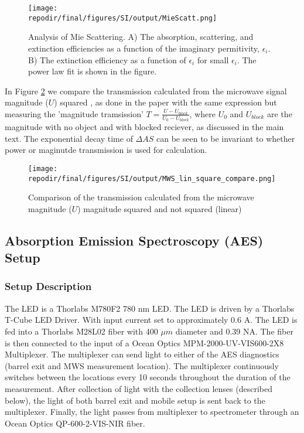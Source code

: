 \begin{figure}[H]
\centering
\texttt{[image: \\repodir/final/figures/SI/output/MieScatt.png]}
\caption{Analysis of Mie Scattering. A) The absorption, scattering, and extinction efficiencies as a function of the imaginary permitivity, $\epsilon_i$. B) The extinction efficiency as a function of $\epsilon_i$ for small $\epsilon_i$. The power law fit is shown in the figure.}
\label{fig:SI_Mie_Scattering}
\end{figure}

In Figure \ref{fig:SI_MWS_lin_square_compare} we compare the transmission calculated from the microwave signal magnitude ($U$) squared , as done in the paper with the same expression but measuring the 'magnitude tramsission' $T  = \frac{U - U_{block}}{U_0 - U_{block}}$, where $U_0$ and $U_{block}$ are the magnitude with no object and with blocked reciever, as discussed in the main text. The exponential decay time of $\Delta AS$ can be seen to be invariant to whether power or maginutde transmission is used for calculation. 


\begin{figure}[H]
\centering
\texttt{[image: \\repodir/final/figures/SI/output/MWS\_lin\_square\_compare.png]}
\caption{Comparison of the transmission calculated from the microwave magnitude ($U$) magnitude squared and not squared (linear)}
\label{fig:SI_MWS_lin_square_compare}
\end{figure}


\clearpage
\subsection{Absorption Emission Spectroscopy (AES) Setup}

\subsubsection{Setup Description}

The LED is a Thorlabs M780F2 780 nm LED. The LED is driven by a Thorlabs T-Cube LED Driver. With input current set to approximately 0.6 A. The LED is fed into a Thorlabs M28L02 fiber with 400 $\mu m$ diameter and 0.39 NA. The fiber is then connected to the input of a  Ocean Optics MPM-2000-UV-VIS600-2X8 Multiplexer.  The multiplexer can send light to either of the AES diagnostics (barrel exit and MWS measurement location). The multiplexer continuously switches between the locations every 10 seconds throughout the duration of the measurement. After collection of light with the collection lenses (described below), the light of both barrel exit and mobile setup is sent back to the multiplexer. Finally, the light passes from multiplexer to spectrometer through an Ocean Optics QP-600-2-VIS-NIR fiber.

